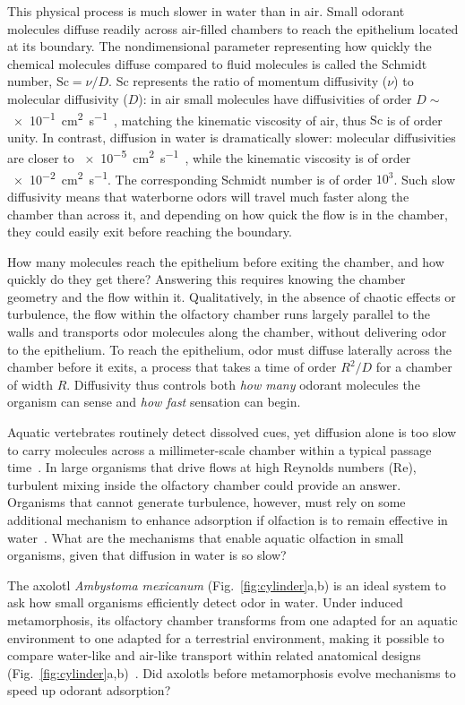 \documentclass[%
 twocolumn,
 amsmath,amssymb,
 aps,prfluids,
 superscriptaddress,
]{revtex4-2}
\newcommand{\Sc}{\mathrm{Sc}}
\newcommand{\Rey}{\mathrm{Re}}
\begin{document}
This physical process is much slower in water than in air. Small odorant molecules diffuse readily across air-filled chambers to reach the epithelium located at its boundary. The nondimensional parameter representing how quickly the chemical molecules diffuse compared to fluid molecules is called the Schmidt number, $\Sc=\nu/D$. $\Sc$ represents the ratio of momentum diffusivity ($\nu$) to molecular diffusivity ($D$): in air small molecules have diffusivities of order $D\sim$\SI{e-1}{\square\centi\meter\per\second}~\cite{tang2015compilation}, matching the kinematic viscosity of air, thus $\Sc$ is of order unity. In contrast, diffusion in water is dramatically slower: molecular diffusivities are closer to \SI{e-5}{\square\centi\meter\per\second}~\cite{delgado2007molecular}, while the kinematic viscosity is of order \SI{e-2}{\square\centi\meter\per\second}. The corresponding Schmidt number is of order $10^3$. Such slow diffusivity means that waterborne odors will travel much faster along the chamber than across it, and depending on how quick the flow is in the chamber, they could easily exit before reaching the boundary. 

How many molecules reach the epithelium before exiting the chamber, and how quickly do they get there? Answering this requires knowing the chamber geometry and the flow within it. Qualitatively, in the absence of chaotic effects or turbulence, the flow within the olfactory chamber runs largely parallel to the walls and transports odor molecules along the chamber, without delivering odor to the epithelium. To reach the epithelium, odor must diffuse laterally across the chamber before it exits, a process that takes a time of order $R^2/D$ for a chamber of width $R$. Diffusivity thus controls both \emph{how many} odorant molecules the organism can sense and \emph{how fast} sensation can begin.

Aquatic vertebrates routinely detect dissolved cues, yet diffusion alone is too slow to carry molecules across a millimeter-scale chamber within a typical passage time~\cite{cox2008hydrodynamic}. In large organisms that drive flows at high Reynolds numbers ($\Rey$), turbulent mixing inside the olfactory chamber could provide an answer. Organisms that cannot generate turbulence, however, must rely on some additional mechanism to enhance adsorption if olfaction is to remain effective in water~\cite{koehl2001lobster}.
What are the mechanisms that enable aquatic olfaction in small organisms, given that diffusion in water is so slow? 

The axolotl \textit{Ambystoma mexicanum} (Fig.~\ref{fig:cylinder}a,b) is an ideal system to ask how small organisms efficiently detect odor in water. Under induced metamorphosis, its olfactory chamber transforms from one adapted for an aquatic environment to one adapted for a terrestrial environment, making it possible to compare water-like and air-like transport within related anatomical designs (Fig.~\ref{fig:cylinder}a,b)~\cite{stuelpnagel2005olfactory,rozanski2020macro}. 
Did axolotls before metamorphosis evolve mechanisms to speed up odorant adsorption?  
\end{document}
